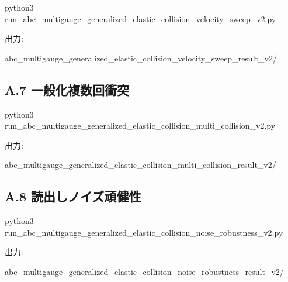 \documentclass[
  a4paper,
]{article}
\newenvironment{Shaded}{}{}
\newcommand{\NormalTok}[1]{#1}
\begin{document}
\begin{Shaded}
\begin{Highlighting}[]
\NormalTok{python3 run\_abc\_multigauge\_generalized\_elastic\_collision\_velocity\_sweep\_v2.py}
\end{Highlighting}
\end{Shaded}

出力:

\begin{Shaded}
\begin{Highlighting}[]
\NormalTok{abc\_multigauge\_generalized\_elastic\_collision\_velocity\_sweep\_result\_v2/}
\end{Highlighting}
\end{Shaded}

\subsection{A.7
一般化複数回衝突}\label{a.7-ux4e00ux822cux5316ux8907ux6570ux56deux885dux7a81}

\begin{Shaded}
\begin{Highlighting}[]
\NormalTok{python3 run\_abc\_multigauge\_generalized\_elastic\_collision\_multi\_collision\_v2.py}
\end{Highlighting}
\end{Shaded}

出力:

\begin{Shaded}
\begin{Highlighting}[]
\NormalTok{abc\_multigauge\_generalized\_elastic\_collision\_multi\_collision\_result\_v2/}
\end{Highlighting}
\end{Shaded}

\subsection{A.8
読出しノイズ頑健性}\label{a.8-ux8aadux51faux3057ux30ceux30a4ux30baux9811ux5065ux6027}

\begin{Shaded}
\begin{Highlighting}[]
\NormalTok{python3 run\_abc\_multigauge\_generalized\_elastic\_collision\_noise\_robustness\_v2.py}
\end{Highlighting}
\end{Shaded}

出力:

\begin{Shaded}
\begin{Highlighting}[]
\NormalTok{abc\_multigauge\_generalized\_elastic\_collision\_noise\_robustness\_result\_v2/}
\end{Highlighting}
\end{Shaded}
\end{document}
